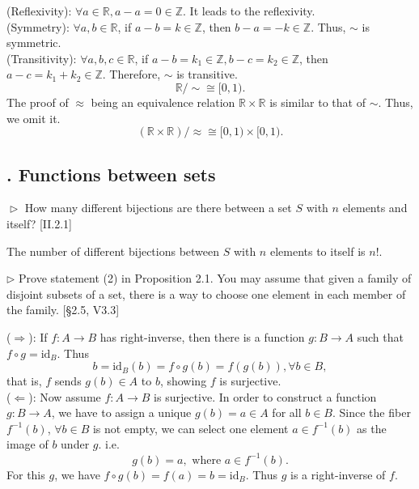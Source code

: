 \begin{solution}
(Reflexivity): $\forall a\in \mathbb{R}, a-a=0\in\mathbb{Z}$. It leads to the reflexivity.\\
(Symmetry): $\forall a, b\in \mathbb{R}$, if $a-b=k\in \mathbb{Z}$, then $b-a=-k\in \mathbb{Z}$. Thus, $\sim$ is symmetric.\\
(Transitivity): $\forall a, b,c\in \mathbb{R}$, if  $a-b=k_1\in  \mathbb{Z}, b-c=k_2\in  \mathbb{Z}$, 
then $a-c=k_1+k_2\in  \mathbb{Z}$. Therefore, $\sim$ is transitive.  
$$\mathbb{R}/\sim \cong [0,1).$$
The proof of $\approx$ being an equivalence relation $\mathbb{R}\times\mathbb{R}$ is similar to that of $\sim$. Thus, we omit it.
$$(\mathbb{R}\times\mathbb{R})/\approx \cong [0,1)\times [0,1).$$
\end{solution}

\subsection{. Functions between sets}

\hypertarget{Exercise I.2.1}{}
\begin{problem}[2.1]
$\vartriangleright$ How many different bijections are there between a set $S$ with $n$ elements
and itself? [\textsection II.2.1]
\end{problem}

\begin{solution}
The number of different bijections between $S$ with $n$ elements to itself is $n!$.
\end{solution}

\hypertarget{Exercise I.2.2}{}
\begin{problem}[2.2]
 $\rhd$ Prove statement (2) in Proposition 2.1. You may assume that given a
  family of disjoint subsets of a set, there is a way to choose one element in
  each member of the family. [\S2.5, V3.3]
\end{problem}

\begin{solution}
($\Longrightarrow$): If $f: A\rightarrow B$ has right-inverse, then there is a function $g: B\rightarrow  A$ such that $f\circ g = \text{id}_{B}$. Thus
$$b = \text{id}_{B}(b) = f\circ g(b) = f(g(b)), \forall b\in B,$$that is, $f$ sends $g(b)\in A$ to $b$, showing $f$ is surjective. \\
($\Longleftarrow $): Now assume $f: A\rightarrow B$ is surjective. In order to construct a function
$g: B\rightarrow A$, we have to assign a unique $g(b) = a\in A$ for all $b\in B$. Since the fiber $f^{-1}(b)$, $\forall b\in B$ is not empty, 
we can select one element $a\in f^{-1}(b)$ as the image of $b$ under $g$. i.e.   
$$g(b) = a, \text{ where } a\in f^{-1}(b).$$
For this $g$, we have $f\circ g(b) = f(a) = b=\text{id}_{B}$. Thus $g$ is a right-inverse of $f$. 
\end{solution}

